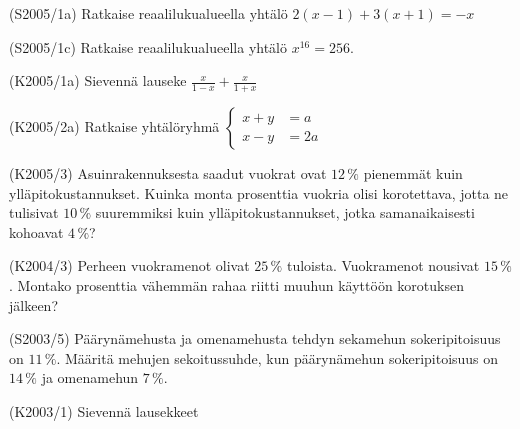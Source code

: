 \begin{tehtava}(S2005/1a)  Ratkaise reaalilukualueella yhtälö 
                       $ 2(x - 1) + 3(x + 1 ) = -x $
\end{tehtava}

\begin{tehtava}(S2005/1c)  Ratkaise reaalilukualueella yhtälö $ x^{16} = 256 $.
\end{tehtava}

\begin{tehtava}(K2005/1a)  Sievennä lauseke
                        $ \frac{x}{1 - x} + \frac{x}{1 + x} $
\end{tehtava}

\begin{tehtava}(K2005/2a)  Ratkaise yhtälöryhmä
                      $
                        \left\{
                        \begin{aligned}
                             x + y &= a \\
                             x - y &= 2a
                        \end{aligned}
                        \right.
                    $
\end{tehtava}

\begin{tehtava}(K2005/3)   Asuinrakennuksesta saadut vuokrat ovat $12\,\%$ pienemmät kuin
                        ylläpitokustannukset. Kuinka monta prosenttia vuokria olisi
                        korotettava, jotta ne tulisivat $10\,\%$ suuremmiksi kuin 
                        ylläpitokustannukset, jotka samanaikaisesti kohoavat $4\,\%$?
\end{tehtava}

\begin{tehtava}(K2004/3)   Perheen vuokramenot olivat $25\,\%$ tuloista. Vuokramenot nousivat
                        $15\,\%$. Montako prosenttia vähemmän rahaa riitti muuhun
                        käyttöön korotuksen jälkeen?
\end{tehtava}

\begin{tehtava}(S2003/5)   Päärynämehusta ja omenamehusta tehdyn sekamehun sokeripitoisuus
                        on $11\,\%$. Määritä mehujen sekoitussuhde, kun päärynämehun
                        sokeripitoisuus on $14\,\%$ ja omenamehun $7\,\%$.
\end{tehtava}


\begin{tehtava}(K2003/1)   Sievennä lausekkeet
\end{tehtava}

